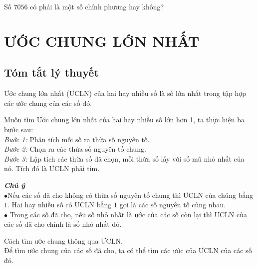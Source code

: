 \begin{bt}%
	Số $7056$ có phải là một số chính phương hay không?
\end{bt}
\clearpage
\section{ƯỚC CHUNG LỚN NHẤT}
\subsection{Tóm tắt lý thuyết}
	\begin{enumEX}[1)]{1}
		\item Ước chung lớn nhất (ƯCLN) của hai hay nhiều số là số lớn nhất trong tập hợp các ước chung của các số đó.
		\item Muốn tìm Ước chung lớn nhất của hai hay nhiều số lớn hơn 1, ta thực hiện ba bước sau:\\
		\textit{Bước 1:} Phân tích mỗi số ra thừa số nguyên tố. \\
		\textit{Bước 2:} Chọn ra các thừa số nguyên tố chung.\\
		\textit{Bước 3:} Lập tích các thừa số đã chọn, mỗi thừa số lấy với số mũ nhỏ nhất của nó. Tích đó là ƯCLN phải tìm.
		\begin{note} \textbf{\textit{Chú ý}}\\
		$\bullet$Nếu các số đã cho không có thừa số nguyên tố chung thì ƯCLN của chúng bằng $1$. Hai hay nhiều số có ƯCLN bằng $1$ gọi là các số nguyên tố cùng nhau.\\
		$\bullet$ Trong các số đã cho, nếu số nhỏ nhất là ước của các số còn lại thì ƯCLN của các số đã cho chính là số nhỏ nhất đó.
		\end{note}
		\item Cách tìm ước chung thông qua ƯCLN. \\
		Để tìm ước chung của các số đã cho, ta có thể tìm các ước của ƯCLN của các số đó.
	\end{enumEX}
